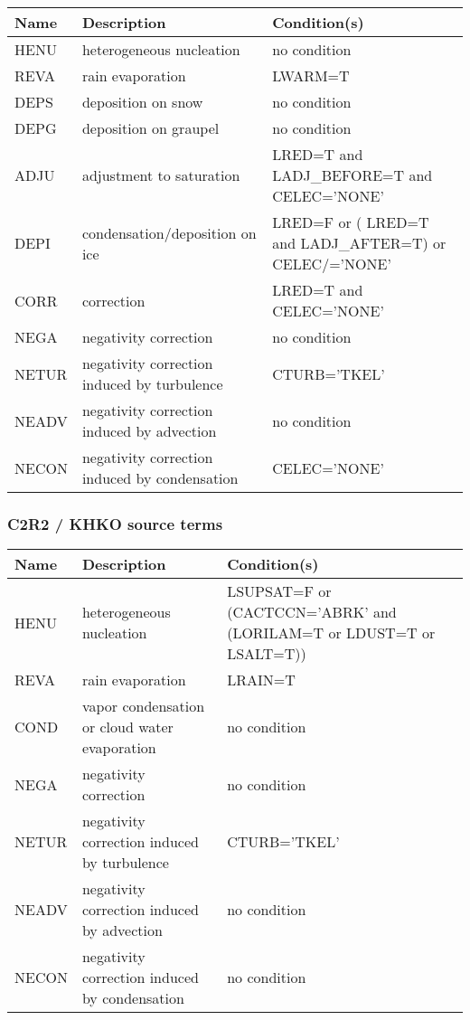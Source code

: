 \begin{longtable} {|p{}|p{}|p{}|}
\hline
Name & Description & Condition(s) \\
\hline \hline
\endhead
HENU   & heterogeneous nucleation                      & no condition \\\hline
REVA   & rain evaporation                              & LWARM=T \\\hline
DEPS   & deposition on snow                            & no condition \\\hline
DEPG   & deposition on graupel                         & no condition \\\hline
ADJU   & adjustment to saturation                      & LRED=T and LADJ\_BEFORE=T and CELEC='NONE' \\\hline
DEPI   & condensation/deposition on ice                & LRED=F or ( LRED=T and LADJ\_AFTER=T) or CELEC/='NONE' \\\hline
CORR   & correction                                    & LRED=T and CELEC='NONE' \\\hline
NEGA   & negativity correction                         & no condition \\\hline
NETUR  & negativity correction induced by turbulence   & CTURB='TKEL' \\\hline
NEADV  & negativity correction induced by advection    & no condition \\\hline
NECON  & negativity correction induced by condensation & CELEC='NONE' \\\hline
\end{longtable}

\subsubsection{C2R2 / KHKO source terms}

\begin{longtable} {|p{}|p{}|p{}|}
\hline
Name & Description & Condition(s) \\
\hline \hline
\endhead
HENU   & heterogeneous nucleation                      & LSUPSAT=F or (CACTCCN='ABRK' and (LORILAM=T or LDUST=T or LSALT=T)) \\\hline
REVA   & rain evaporation                              & LRAIN=T \\\hline
COND   & vapor condensation or cloud water evaporation & no condition \\\hline
NEGA   & negativity correction                         & no condition \\\hline
NETUR  & negativity correction induced by turbulence   & CTURB='TKEL' \\\hline
NEADV  & negativity correction induced by advection    & no condition \\\hline
NECON  & negativity correction induced by condensation & no condition \\\hline
\end{longtable}

